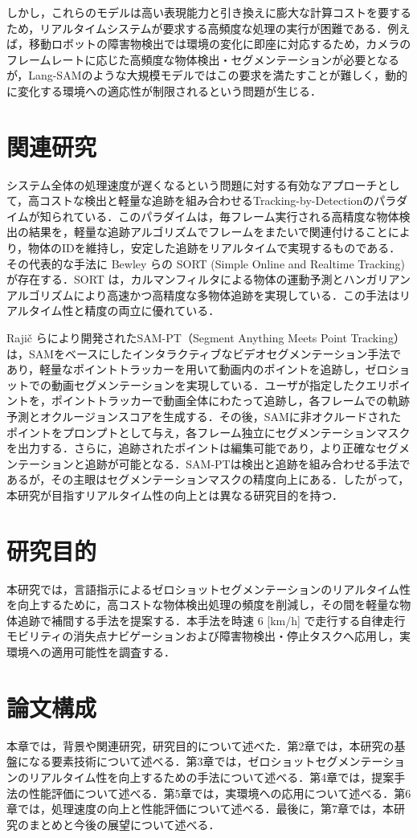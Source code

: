 しかし，これらのモデルは高い表現能力と引き換えに膨大な計算コストを要するため，リアルタイムシステムが要求する高頻度な処理の実行が困難である．例えば，移動ロボットの障害物検出では環境の変化に即座に対応するため，カメラのフレームレートに応じた高頻度な物体検出・セグメンテーションが必要となるが，Lang-SAMのような大規模モデルではこの要求を満たすことが難しく，動的に変化する環境への適応性が制限されるという問題が生じる．

\newpage

\section{関連研究}
システム全体の処理速度が遅くなるという問題に対する有効なアプローチとして，高コストな検出と軽量な追跡を組み合わせるTracking-by-Detectionのパラダイムが知られている．このパラダイムは，毎フレーム実行される高精度な物体検出の結果を，軽量な追跡アルゴリズムでフレームをまたいで関連付けることにより，物体のIDを維持し，安定した追跡をリアルタイムで実現するものである．その代表的な手法に Bewley らの SORT (Simple Online and Realtime Tracking) \cite{sort} が存在する．SORT は，カルマンフィルタによる物体の運動予測とハンガリアンアルゴリズムにより高速かつ高精度な多物体追跡を実現している．この手法はリアルタイム性と精度の両立に優れている．

Rajič らにより開発されたSAM-PT（Segment Anything Meets Point Tracking）\cite{sampt} は，SAMをベースにしたインタラクティブなビデオセグメンテーション手法であり，軽量なポイントトラッカーを用いて動画内のポイントを追跡し，ゼロショットでの動画セグメンテーションを実現している．ユーザが指定したクエリポイントを，ポイントトラッカーで動画全体にわたって追跡し，各フレームでの軌跡予測とオクルージョンスコアを生成する．その後，SAMに非オクルードされたポイントをプロンプトとして与え，各フレーム独立にセグメンテーションマスクを出力する．さらに，追跡されたポイントは編集可能であり，より正確なセグメンテーションと追跡が可能となる．SAM-PTは検出と追跡を組み合わせる手法であるが，その主眼はセグメンテーションマスクの精度向上にある．したがって，本研究が目指すリアルタイム性の向上とは異なる研究目的を持つ．

\newpage

\section{研究目的}
本研究では，言語指示によるゼロショットセグメンテーションのリアルタイム性を向上するために，高コストな物体検出処理の頻度を削減し，その間を軽量な物体追跡で補間する手法を提案する．本手法を時速 6 [km/h] で走行する自律走行モビリティの消失点ナビゲーションおよび障害物検出・停止タスクへ応用し，実環境への適用可能性を調査する．

\section{論文構成}
本章では，背景や関連研究，研究目的について述べた．第2章では，本研究の基盤になる要素技術について述べる．第3章では，ゼロショットセグメンテーションのリアルタイム性を向上するための手法について述べる．第4章では，提案手法の性能評価について述べる．第5章では，実環境への応用について述べる．第6章では，処理速度の向上と性能評価について述べる．最後に，第7章では，本研究のまとめと今後の展望について述べる．

\newpage
